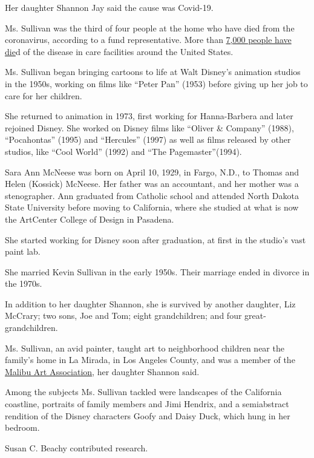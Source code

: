 Her daughter Shannon Jay said the cause was Covid-19.

Ms. Sullivan was the third of four people at the home who have died from
the coronavirus, according to a fund representative. More than
\href{https://www.nytimes3xbfgragh.onion/2020/04/17/us/coronavirus-nursing-homes.html}{7,000
people have die}d of the disease in care facilities around the United
States.

Ms. Sullivan began bringing cartoons to life at Walt Disney's animation
studios in the 1950s, working on films like ``Peter Pan'' (1953) before
giving up her job to care for her children.

She returned to animation in 1973, first working for Hanna-Barbera and
later rejoined Disney. She worked on Disney films like ``Oliver \&
Company'' (1988), ``Pocahontas'' (1995) and ``Hercules'' (1997) as well
as films released by other studios, like ``Cool World'' (1992) and ``The
Pagemaster''(1994).

Sara Ann McNeese was born on April 10, 1929, in Fargo, N.D., to Thomas
and Helen (Kossick) McNeese. Her father was an accountant, and her
mother was a stenographer. Ann graduated from Catholic school and
attended North Dakota State University before moving to California,
where she studied at what is now the ArtCenter College of Design in
Pasadena.

She started working for Disney soon after graduation, at first in the
studio's vast paint lab.

She married Kevin Sullivan in the early 1950s. Their marriage ended in
divorce in the 1970s.

In addition to her daughter Shannon, she is survived by another
daughter, Liz McCrary; two sons, Joe and Tom; eight grandchildren; and
four great-grandchildren.

Ms. Sullivan, an avid painter, taught art to neighborhood children near
the family's home in La Mirada, in Los Angeles County, and was a member
of the \href{https://malibuartassociation.com/}{Malibu Art Association},
her daughter Shannon said.

Among the subjects Ms. Sullivan tackled were landscapes of the
California coastline, portraits of family members and Jimi Hendrix, and
a semiabstract rendition of the Disney characters Goofy and Daisy Duck,
which hung in her bedroom.

Susan C. Beachy contributed research.

\href{https://www.nytimes3xbfgragh.onion/interactive/2020/obituaries/people-died-coronavirus-obituaries.html?action=click\&pgtype=Article\&state=default\&region=BELOW_MAIN_CONTENT\&context=covid_obits_promo}{}


